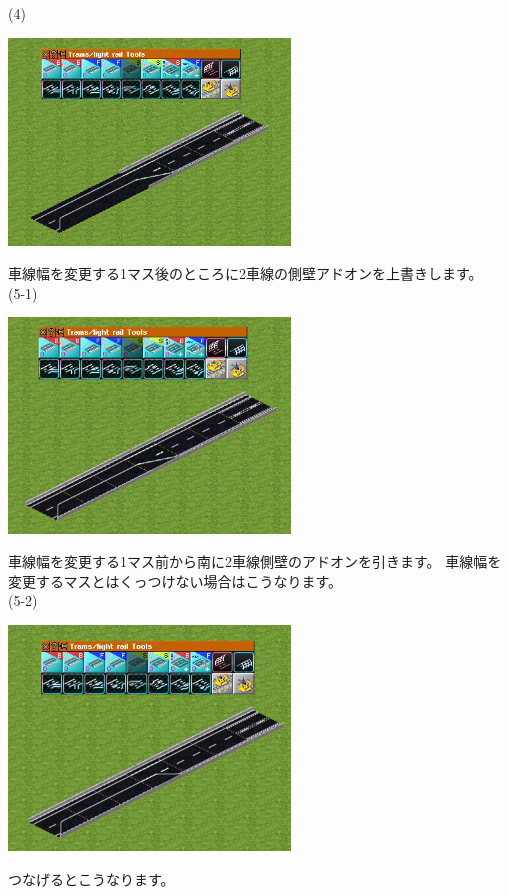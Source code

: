 \documentclass{jbook}
\begin{document}
\begin{multicols}{2}
\newpage
(4)

\includegraphics[width = 75mm]{picture/20210214-road-4-4.png}

車線幅を変更する1マス後のところに2車線の側壁アドオンを上書きします。\\


(5-1)

\includegraphics[width = 75mm]{picture/20210214-road-4-6.png}

車線幅を変更する1マス前から南に2車線側壁のアドオンを引きます。
車線幅を変更するマスとはくっつけない場合はこうなります。\\

(5-2)

\includegraphics[width = 75mm]{picture/20210214-road-4-7.png}

つなげるとこうなります。

\end{multicols}
\end{document}
